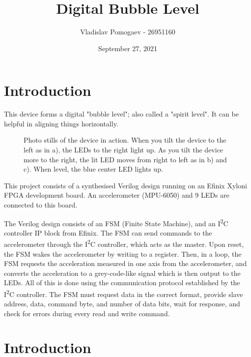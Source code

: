 \documentclass[11pt]{article}
\title{Digital Bubble Level}
\author{Vladislav Pomogaev - 26951160}
\date{September 27, 2021}
\begin{document}
\maketitle

\section{Introduction}
This device forms a digital "bubble level"; also called a "spirit level". It can be helpful in aligning things horizontally.
\begin{figure}[H]
    \centering
    \caption{Photo stills of the device in action. When you tilt the device to the left as in a), the LEDs to the right light up. As you tilt the device more to the right, the lit LED moves from right to left as in b) and c). When level, the blue center LED lights up.}
    \label{fig:foobar}
\end{figure}

This project consists of a synthesised Verilog design running on an Efinix Xyloni FPGA development board. An accelerometer (MPU-6050) and 9 LEDs are connected to this board.

The Verilog design consists of an FSM (Finite State Machine), and an I\textsuperscript{2}C controller IP block from Efinix. The FSM can send commands to the accelerometer through the I\textsuperscript{2}C controller, which acts as the master. Upon reset, the FSM wakes the accelerometer by writing to a register. Then, in a loop, the FSM requests the acceleration measured in one axis from the accelerometer, and converts the acceleration to a grey-code-like signal which is then output to the LEDs. All of this is done using the communication protocol established by the I\textsuperscript{2}C controller. The FSM must request data in the correct format, provide slave address, data, command byte, and number of data bits, wait for response, and check for errors during every read and write command.

\section{Introduction}
\end{document}
